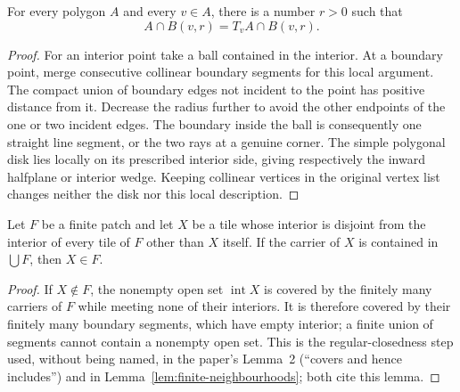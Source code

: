 \begin{lemma}
\label{lem:polygon-local-cone}
For every polygon $A$ and every $v\in A$, there is a number $r>0$ such that
\[
  A\cap B(v,r)=T_vA\cap B(v,r).
\]
\end{lemma}
\begin{proof}
For an interior point take a ball contained in the interior.  At a boundary
point, merge consecutive collinear boundary segments for this local
argument.  The compact union of boundary edges not incident to the point
has positive distance from it.  Decrease the radius further to avoid the
other endpoints of the one or two incident edges.  The boundary inside the
ball is consequently one straight line segment, or the two rays at a
genuine corner.  The simple polygonal disk lies locally on its prescribed
interior side, giving respectively the inward halfplane or interior wedge.
Keeping collinear vertices in the original vertex list changes neither
the disk nor this local description.
\end{proof}

\begin{lemma}
\label{lem:covered-tile-belongs}
Let $F$ be a finite patch and let $X$ be a tile whose interior is disjoint
from the interior of every tile of $F$ other than $X$ itself. If the
carrier of $X$ is contained in $\bigcup F$, then $X\in F$.
\end{lemma}
\begin{proof}
If $X\notin F$, the nonempty open set $\operatorname{int}X$ is covered by
the finitely many carriers of $F$ while meeting none of their interiors.
It is therefore covered by their finitely many boundary segments, which
have empty interior; a finite union of segments cannot contain a nonempty
open set. This is the regular-closedness step used, without being named,
in the paper's Lemma~2 (``covers and hence includes'') and in
Lemma~\ref{lem:finite-neighbourhoods}; both cite this lemma.
\end{proof}

